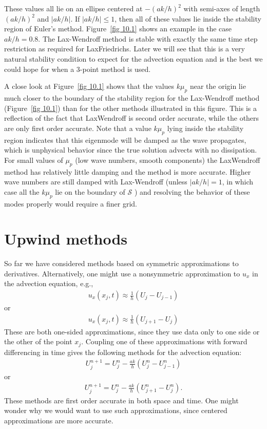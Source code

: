 These values all lie on an ellipse centered at $-(a k / h)^2$ with semi-axes of length $(a k / h)^2$ and $|a k / h|$. If $|a k / h| \leq 1$, then all of these values lie inside the stability region of Euler's method. Figure~\ref{fig 10.1} shows an example in the case $a k / h=0.8$. The Lax-Wendroff method is stable with exactly the same time step restriction as required for LaxFriedrichs. Later we will see that this is a very natural stability condition to expect for the advection equation and is the best we could hope for when a 3-point method is used.

A close look at Figure~\ref{fig 10.1} shows that the values $k \mu_p$ near the origin lie much closer to the boundary of the stability region for the Lax-Wendroff method (Figure~\ref{fig 10.1}) than for the other methods illustrated in this figure. This is a reflection of the fact that LaxWendroff is second order accurate, while the others are only first order accurate. Note that a value $k \mu_p$ lying inside the stability region indicates that this eigenmode will be damped as the wave propagates, which is unphysical behavior since the true solution advects with no dissipation. For small values of $\mu_p$ (low wave numbers, smooth components) the LaxWendroff method has relatively little damping and the method is more accurate. Higher wave numbers are still damped with Lax-Wendroff (unless $|a k / h|=1$, in which case all the $k \mu_p$ lie on the boundary of $\mathcal{S}$ ) and resolving the behavior of these modes properly would require a finer grid.

\section{Upwind methods} 
So far we have considered methods based on symmetric approximations to derivatives. Alternatively, one might use a nonsymmetric approximation to $u_x$ in the advection equation, e.g.,
\begin{align*}
u_x\left(x_j, t\right) \approx \frac{1}{h}\left(U_j-U_{j-1}\right)
\end{align*}
or
\begin{align*}
u_x\left(x_j, t\right) \approx \frac{1}{h}\left(U_{j+1}-U_j\right)
\end{align*}
These are both one-sided approximations, since they use data only to one side or the other of the point $x_j$. Coupling one of these approximations with forward differencing in time gives the following methods for the advection equation:
\begin{align}
    \label{eq: upwind}
U_j^{n+1}=U_j^n-\frac{a k}{h}\left(U_j^n-U_{j-1}^n\right)
\end{align}
or
\begin{align}
    \label{eq: downwind}
U_j^{n+1}=U_j^n-\frac{a k}{h}\left(U_{j+1}^n-U_j^n\right) .
\end{align}
These methods are first order accurate in both space and time. One might wonder why we would want to use such approximations, since centered approximations are more accurate. 

